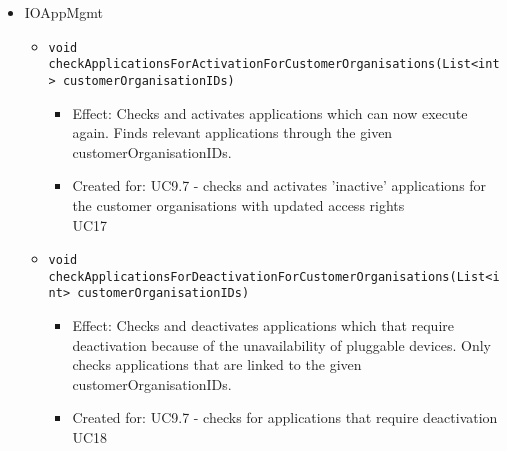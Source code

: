 {{{\begin{itemize}
            \item IOAppMgmt
                \begin{itemize}
                    \item \texttt{void checkApplicationsForActivationForCustomerOrganisations(List<int> customerOrganisationIDs)}
                        \begin{itemize}
                			\item Effect: Checks and activates applications which can now execute again. Finds relevant applications through the given customerOrganisationIDs.
                			\item Created for: UC9.7 - checks and activates 'inactive' applications for the customer organisations with updated access rights \\ UC17
                        \end{itemize}
                    \item \texttt{void checkApplicationsForDeactivationForCustomerOrganisations(List<int> customerOrganisationIDs)}
                        \begin{itemize}
                			\item Effect: Checks and deactivates applications which that require deactivation because of the unavailability of pluggable devices.
                                  Only checks applications that are linked to the given customerOrganisationIDs.
                			\item Created for: UC9.7 - checks for applications that require deactivation \\ UC18
                        \end{itemize}
                \end{itemize}
        \end{itemize}

}}}
